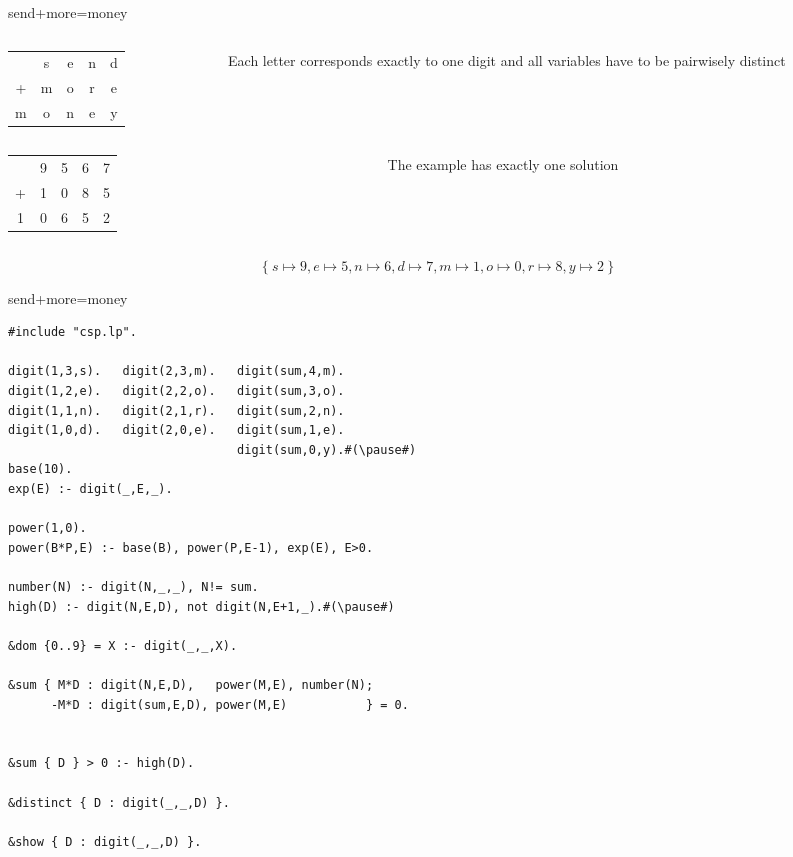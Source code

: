 \begin{frame}[c]{send+more=money}
  \begin{columns}
    \begin{column}{.35\textwidth}
      \begin{tabular}[t]{ccccc}
         &s&e&n&d\\
        +&m&o&r&e\\
        \hline
        m&o&n&e&y
      \end{tabular}
    \end{column}
    \begin{column}{.35\textwidth}
      Each letter corresponds exactly to one digit and all variables have to be
      pairwisely distinct
    \end{column}
  \end{columns}
\pause
\bigskip\bigskip
  \begin{columns}
    \begin{column}{.35\textwidth}
      \begin{tabular}[t]{ccccc}
         &9&5&6&7\\
        +&1&0&8&5\\
        \hline
        1&0&6&5&2
      \end{tabular}
    \end{column}
    \begin{column}{.35\textwidth}
      The example has exactly one solution
    \end{column}
  \end{columns}
\[
\{\ s\mapsto9, e\mapsto5, n\mapsto6, d\mapsto7, m\mapsto1, o\mapsto0, r\mapsto8, y\mapsto2\ \}
\]
\end{frame}
\begin{frame}[fragile,shrink=1]{send+more=money}
\begin{lstlisting}
#include "csp.lp".

digit(1,3,s).   digit(2,3,m).   digit(sum,4,m).
digit(1,2,e).   digit(2,2,o).   digit(sum,3,o).
digit(1,1,n).   digit(2,1,r).   digit(sum,2,n).
digit(1,0,d).   digit(2,0,e).   digit(sum,1,e).
                                digit(sum,0,y).#(\pause#)
base(10).
exp(E) :- digit(_,E,_).

power(1,0).
power(B*P,E) :- base(B), power(P,E-1), exp(E), E>0.

number(N) :- digit(N,_,_), N!= sum.
high(D) :- digit(N,E,D), not digit(N,E+1,_).#(\pause#)

&dom {0..9} = X :- digit(_,_,X).

&sum { M*D : digit(N,E,D),   power(M,E), number(N);
      -M*D : digit(sum,E,D), power(M,E)           } = 0.


&sum { D } > 0 :- high(D).

&distinct { D : digit(_,_,D) }.

&show { D : digit(_,_,D) }.
\end{lstlisting}
\end{frame}
